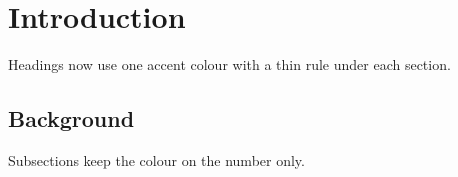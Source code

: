\documentclass{article}
\begin{document}
\section{Introduction}
Headings now use one accent colour with a thin rule under each section.

\subsection{Background}
Subsections keep the colour on the number only.
\end{document}
